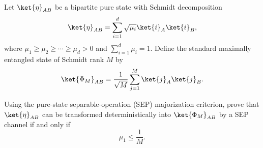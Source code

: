 Let $\ket{\eta}_{AB}$ be a bipartite pure state with Schmidt decomposition
$$
\ket{\eta}_{AB}
=
\sum_{i=1}^d
\sqrt{\mu_i}
\ket{i}_A\ket{i}_B,
$$
where $\mu_1\geq \mu_2\geq \cdots \geq \mu_d>0$ and $\sum_{i=1}^d \mu_i=1$.
Define the standard maximally entangled state of Schmidt rank $M$ by
$$
\ket{\Phi_M}_{AB}
=
\frac{1}{\sqrt{M}}
\sum_{j=1}^M
\ket{j}_A\ket{j}_B.
$$

Using the pure-state separable-operation (SEP) majorization criterion, prove that $\ket{\eta}_{AB}$ can be transformed deterministically into $\ket{\Phi_M}_{AB}$ by a SEP channel if and only if
$$
\mu_1\leq \frac1M.
$$
